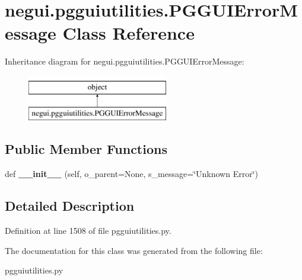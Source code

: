 \hypertarget{classnegui_1_1pgguiutilities_1_1PGGUIErrorMessage}{}\section{negui.\+pgguiutilities.\+P\+G\+G\+U\+I\+Error\+Message Class Reference}
\label{classnegui_1_1pgguiutilities_1_1PGGUIErrorMessage}
Inheritance diagram for negui.\+pgguiutilities.\+P\+G\+G\+U\+I\+Error\+Message\+:\begin{figure}[H]
\begin{center}
\leavevmode
\includegraphics[height=2.000000cm]{classnegui_1_1pgguiutilities_1_1PGGUIErrorMessage}
\end{center}
\end{figure}
\subsection*{Public Member Functions}
\begin{DoxyCompactItemize}
\item 
def {\bfseries \+\_\+\+\_\+init\+\_\+\+\_\+} (self, o\+\_\+parent=None, s\+\_\+message=\char`\"{}Unknown Error\char`\"{})\hypertarget{classnegui_1_1pgguiutilities_1_1PGGUIErrorMessage_a5fd71ce11d3769e9508fb7c1994213d3}{}\label{classnegui_1_1pgguiutilities_1_1PGGUIErrorMessage_a5fd71ce11d3769e9508fb7c1994213d3}

\end{DoxyCompactItemize}


\subsection{Detailed Description}


Definition at line 1508 of file pgguiutilities.\+py.



The documentation for this class was generated from the following file\+:\begin{DoxyCompactItemize}
\item 
pgguiutilities.\+py\end{DoxyCompactItemize}
